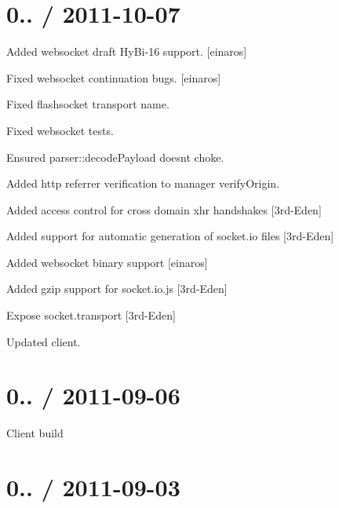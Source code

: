 \section*{0.. / 2011-\/10-\/07 }


\begin{DoxyItemize}
\item Added websocket draft Hy\+Bi-\/16 support. \mbox{[}einaros\mbox{]}
\item Fixed websocket continuation bugs. \mbox{[}einaros\mbox{]}
\item Fixed flashsocket transport name.
\item Fixed websocket tests.
\item Ensured {\ttfamily parser\+::decode\+Payload} doesn\textquotesingle{}t choke.
\item Added http referrer verification to manager verify\+Origin.
\item Added access control for cross domain xhr handshakes \mbox{[}3rd-\/\+Eden\mbox{]}
\item Added support for automatic generation of socket.\+io files \mbox{[}3rd-\/\+Eden\mbox{]}
\item Added websocket binary support \mbox{[}einaros\mbox{]}
\item Added gzip support for socket.\+io.\+js \mbox{[}3rd-\/\+Eden\mbox{]}
\item Expose socket.\+transport \mbox{[}3rd-\/\+Eden\mbox{]}
\item Updated client.
\end{DoxyItemize}

\section*{0.. / 2011-\/09-\/06 }


\begin{DoxyItemize}
\item Client build
\end{DoxyItemize}

\section*{0.. / 2011-\/09-\/03 }


